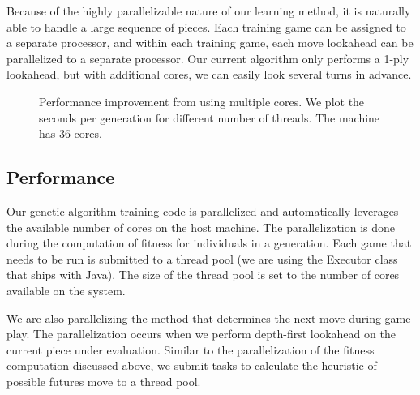 \documentclass[12pt, twocolumn]{article}
\begin{document}
Because of the highly parallelizable nature of our learning method, it is naturally able to handle a large sequence of pieces. Each training game can be assigned to a separate processor, and within each training game, each move lookahead can be parallelized to a separate processor. Our current algorithm only performs a 1-ply lookahead, but with additional cores, we can easily look several turns in advance.

\begin{figure}
\centering
{}
\caption{Performance improvement from using multiple cores. We plot
         the seconds per generation for different number of threads.
         The machine has 36 cores.} \label{fig:traincores}
\end{figure}


\subsection*{Performance}
Our genetic algorithm training code is parallelized and automatically leverages the available number of cores on the host machine. The parallelization is done during the computation of fitness for individuals in a generation. Each game that needs to be run is submitted to a thread pool (we are using the Executor class that ships with Java). The size of the thread pool is set to the number of cores available on the system.

We are also parallelizing the method that determines the next move during game play. The parallelization occurs when we perform depth-first lookahead on the current piece under evaluation. Similar to the parallelization of the fitness computation discussed above, we submit tasks to calculate the heuristic of  possible futures move to a thread pool.
\end{document}
